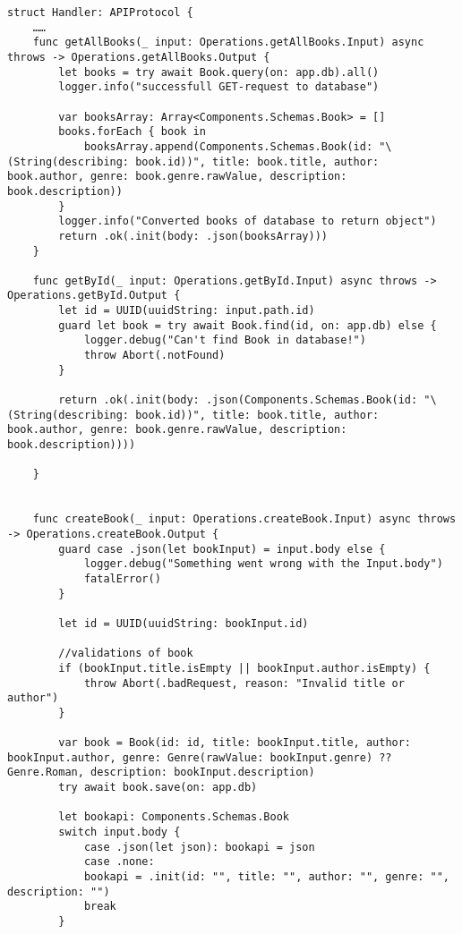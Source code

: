 \begin{lstlisting}[caption=handler file]
struct Handler: APIProtocol {
    ……    
    func getAllBooks(_ input: Operations.getAllBooks.Input) async throws -> Operations.getAllBooks.Output {
        let books = try await Book.query(on: app.db).all()
        logger.info("successfull GET-request to database")
        
        var booksArray: Array<Components.Schemas.Book> = []
        books.forEach { book in
            booksArray.append(Components.Schemas.Book(id: "\(String(describing: book.id))", title: book.title, author: book.author, genre: book.genre.rawValue, description: book.description))
        }
        logger.info("Converted books of database to return object")
        return .ok(.init(body: .json(booksArray)))
    }
    
    func getById(_ input: Operations.getById.Input) async throws -> Operations.getById.Output {
        let id = UUID(uuidString: input.path.id)
        guard let book = try await Book.find(id, on: app.db) else {
            logger.debug("Can't find Book in database!")
            throw Abort(.notFound)
        }
        
        return .ok(.init(body: .json(Components.Schemas.Book(id: "\(String(describing: book.id))", title: book.title, author: book.author, genre: book.genre.rawValue, description: book.description))))
        
    }
    
    
    func createBook(_ input: Operations.createBook.Input) async throws -> Operations.createBook.Output {
        guard case .json(let bookInput) = input.body else {
            logger.debug("Something went wrong with the Input.body")
            fatalError()
        }
        
        let id = UUID(uuidString: bookInput.id)
        
        //validations of book
        if (bookInput.title.isEmpty || bookInput.author.isEmpty) {
            throw Abort(.badRequest, reason: "Invalid title or author")
        }
        
        var book = Book(id: id, title: bookInput.title, author: bookInput.author, genre: Genre(rawValue: bookInput.genre) ?? Genre.Roman, description: bookInput.description)
        try await book.save(on: app.db)
        
        let bookapi: Components.Schemas.Book
        switch input.body {
            case .json(let json): bookapi = json
            case .none:
            bookapi = .init(id: "", title: "", author: "", genre: "", description: "")
            break
        }
        

\end{lstlisting}
